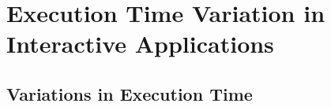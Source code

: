 \section{Execution Time Variation in Interactive Applications}
\label{sec:exec_time_prediction.applications}

%
%
%

\subsection{Variations in Execution Time}


